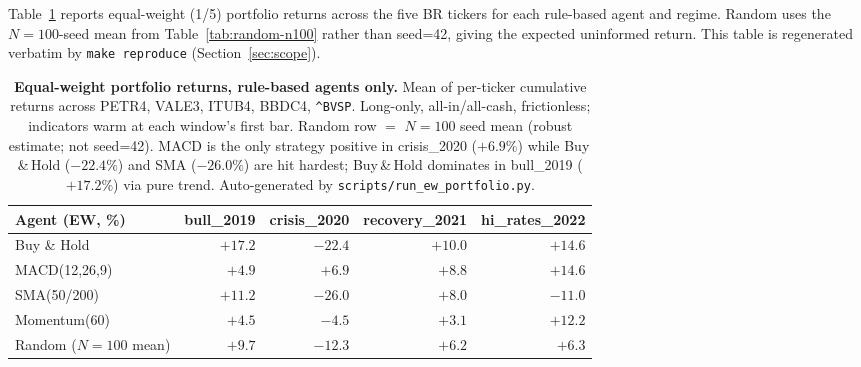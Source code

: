 \documentclass{article}
\begin{document}
Table~\ref{tab:ew-baselines} reports equal-weight (1/5) portfolio
returns across the five BR tickers for each rule-based agent and
regime. Random uses the $N{=}100$-seed mean from
Table~\ref{tab:random-n100} rather than seed=42, giving the expected
uninformed return. This table is regenerated verbatim by
\texttt{make reproduce} (Section~\ref{sec:scope}).

\begin{table}[t]
\centering
\small
\begin{tabular}{lrrrr}
\toprule
\textbf{Agent (EW, \%)} & \textbf{bull\_2019} & \textbf{crisis\_2020}
  & \textbf{recovery\_2021} & \textbf{hi\_rates\_2022} \\
\midrule
Buy \& Hold     & $+17.2$ & $-22.4$ & $+10.0$ & $+14.6$ \\
MACD(12,26,9)   & $+4.9$  & $\mathbf{+6.9}$ & $+8.8$ & $+14.6$ \\
SMA(50/200)     & $+11.2$ & $-26.0$ & $+8.0$  & $-11.0$ \\
Momentum(60)    & $+4.5$  & $-4.5$  & $+3.1$  & $+12.2$ \\
Random ($N{=}100$ mean) & $+9.7$ & $-12.3$ & $+6.2$ & $+6.3$ \\
\bottomrule
\end{tabular}
\caption{\textbf{Equal-weight portfolio returns, rule-based agents only.}
  Mean of per-ticker cumulative returns across PETR4, VALE3, ITUB4,
  BBDC4, \texttt{\^{}BVSP}. Long-only, all-in/all-cash, frictionless;
  indicators warm at each window's first bar. Random row $=$ $N{=}100$
  seed mean (robust estimate; not seed=42).
  MACD is the only strategy positive in crisis\_2020 ($+6.9\%$) while
  Buy\,\&\,Hold ($-22.4\%$) and SMA ($-26.0\%$) are hit hardest;
  Buy\,\&\,Hold dominates in bull\_2019 ($+17.2\%$) via pure trend.
  Auto-generated by \texttt{scripts/run\_ew\_portfolio.py}.}
\label{tab:ew-baselines}
\end{table}

\end{document}
